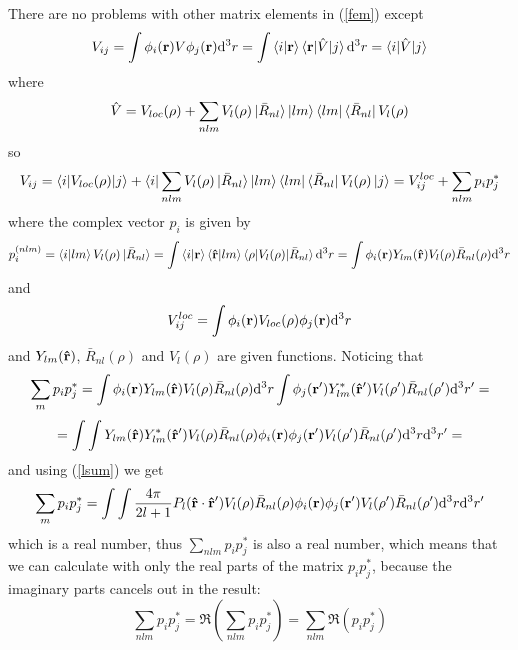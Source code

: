 There are no problems with other matrix elements in (\ref{fem}) except 
\begin{equation*}
  V_{ij} =\int\phi_i({\bf r}) V \phi_j({\bf r}) {\rm d}^3 r =\int\mathinner{\langle{i|{\bf r}}\rangle} \mathinner{\langle{{\bf r}|\hat V|j}\rangle} {\rm d}^3 r =\mathinner{\langle{i|\hat V|j}\rangle}
\end{equation*}
where 
\begin{equation*}
  \hat V=V_{loc}(\rho)+\sum_{nlm}V_l(\rho)\mathinner{|{\bar R_{nl}}\rangle}\mathinner{|{lm}\rangle} \mathinner{\langle{lm}|}\mathinner{\langle{\bar R_{nl}}|}V_l(\rho)
\end{equation*}
so 
\begin{equation*}
  V_{ij}=\mathinner{\langle{i|V_{loc}(\rho)|j}\rangle}+ \mathinner{\langle{i}|}\sum_{nlm}V_l(\rho)\mathinner{|{\bar R_{nl}}\rangle}\mathinner{|{lm}\rangle} \mathinner{\langle{lm}|}\mathinner{\langle{\bar R_{nl}}|}V_l(\rho) \mathinner{|{j}\rangle} =V_{ij}^{loc}+\sum_{nlm}p_ip_j^*
\end{equation*}
where the complex vector $p_i$ is given by 
\begin{equation*}
  p_i^{(nlm)}=\mathinner{\langle{i|lm}\rangle}V_l(\rho)\mathinner{|{\bar R_{nl}}\rangle}= \int\mathinner{\langle{i|{\bf r}}\rangle}\mathinner{\langle{{\bf\hat r}|lm}\rangle} \mathinner{\langle{\rho|V_l(\rho)|\bar R_{nl}}\rangle}{\rm d}^3 r= \int \phi_i({\bf r})Y_{lm}({\bf\hat r})V_l(\rho)\bar R_{nl}(\rho){\rm d}^3 r
\end{equation*}
and 
\begin{equation*}
  V_{ij}^{loc}=\int\phi_i({\bf r}) V_{loc}(\rho) \phi_j({\bf r}) {\rm d}^3 r
\end{equation*}
and $Y_{lm}({\bf\hat r})$, $\bar R_{nl}(\rho)$ and $V_l(\rho)$ are given functions. Noticing that 
\begin{equation*}
  \sum_m p_ip_j^*= \int \phi_i({\bf r})Y_{lm}({\bf\hat r})V_l(\rho)\bar R_{nl}(\rho){\rm d}^3 r \int \phi_j({\bf r'})Y_{lm}^*({\bf\hat r'})V_l(\rho')\bar R_{nl}(\rho'){\rm d}^3 r'=
\end{equation*}
\begin{equation*}
  =\int\int Y_{lm}({\bf\hat r})Y_{lm}^*({\bf\hat r'})V_l(\rho)\bar R_{nl}(\rho) \phi_i({\bf r}) \phi_j({\bf r'})V_l(\rho')\bar R_{nl}(\rho'){\rm d}^3 r{\rm d}^3 r'=
\end{equation*}
and using (\ref{lsum}) we get 
\begin{equation*}
  \sum_m p_ip_j^*= \int\int {4\pi\over 2l+1}P_l({\bf\hat r}\cdot{\bf\hat r'})V_l(\rho)\bar R_{nl}(\rho) \phi_i({\bf r}) \phi_j({\bf r'})V_l(\rho')\bar R_{nl}(\rho'){\rm d}^3 r{\rm d}^3 r'
\end{equation*}
which is a real number, thus $\sum_{nlm}p_ip_j^*$ is also a real number, which means that we can calculate with only the real parts of the matrix $p_ip_j^*$, because the imaginary parts cancels out in the result: 
\begin{equation*}
  \sum_{nlm}p_ip_j^*=\Re\left(\sum_{nlm}p_ip_j^*\right)= \sum_{nlm}\Re(p_ip_j^*)
\end{equation*}

